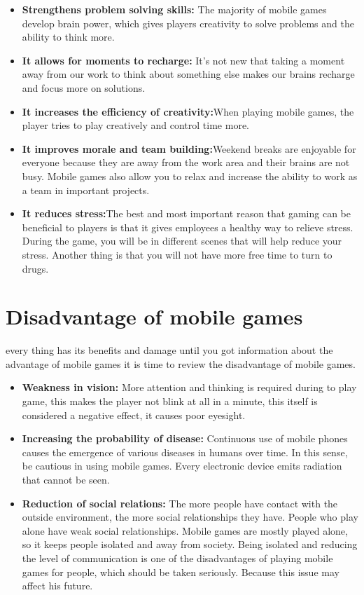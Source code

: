\documentclass[10pt,a4paper]{article}
\begin{document}
\begin{itemize}
    \item \textbf{Strengthens problem solving skills:}
       The majority of mobile games develop brain power, which gives players creativity to solve problems and the ability to think more.
    \item\textbf{It allows for moments to recharge:}
    It's not new that taking a moment away from our work to think about something else makes our brains recharge and focus more on solutions.
    \item\textbf{It  increases the efficiency of creativity:}When playing mobile games, the player tries to play creatively and control time more.
    \item\textbf{It improves morale and team building:}Weekend breaks are enjoyable for everyone because they are away from the work area and their brains are not busy. Mobile games also allow you to relax and increase the ability to work as a team in important projects.
    \item\textbf{It reduces stress:}The best and most important reason that gaming can be beneficial to players is that it gives employees a healthy way to relieve stress. During the game, you will be in different scenes that will help reduce your stress. Another thing is that you will not have more free time to turn to drugs.
\end{itemize}

 \section{Disadvantage of mobile games}%
every thing has its benefits and damage until you got information about the advantage of mobile games it is time to review the disadvantage of mobile games.
\begin{itemize}
    \item \textbf{Weakness in vision:} More attention and thinking is required during to play game, this makes the player not blink at all in a minute, this itself is considered a negative effect, it causes poor eyesight.
    \item\textbf{Increasing the probability of disease:} Continuous use of mobile phones causes the emergence of various diseases in humans over time. In this sense, be cautious in using mobile games. Every electronic device emits radiation that cannot be seen.
    \item\textbf{Reduction of social relations:} The more people have contact with the outside environment, the more social relationships they have. People who play alone have weak social relationships.
Mobile games are mostly played alone, so it keeps people isolated and away from society.
Being isolated and reducing the level of communication is one of the disadvantages of playing mobile games for people, which should be taken seriously. Because this issue may affect his future.
\end{itemize}


 
\end{document}
